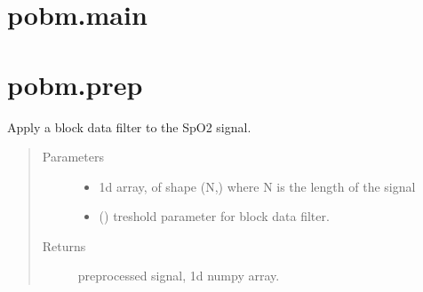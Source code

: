\documentclass[letterpaper,10pt,english]{sphinxmanual}
\begin{document}
\section{pobm.main}
\label{\detokenize{pobm:pobm-main}}

\section{pobm.prep}
\label{\detokenize{pobm:module-pobm.prep}}\label{\detokenize{pobm:pobm-prep}}

\begin{fulllineitems}
\label{\detokenize{pobm:pobm.prep.block_data}}
Apply a block data filter to the SpO2 signal.
\begin{quote}\begin{description}
\item[{Parameters}] \leavevmode\begin{itemize}
\item {} 
 \textendash{} 1\sphinxhyphen{}d array, of shape (N,) where N is the length of the signal

\item {} 
\sphinxstyleliteralstrong{\sphinxupquote{(}}\sphinxstyleliteralstrong{\sphinxupquote{)}} () \textendash{} treshold parameter for block data filter.

\end{itemize}

\item[{Returns}] \leavevmode
preprocessed signal, 1\sphinxhyphen{}d numpy array.

\end{description}\end{quote}

\end{fulllineitems}

\end{document}
